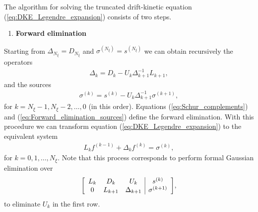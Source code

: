 \documentclass[10pt]{iopart}
\newcommand{\Matrix}[2]
{
	\mleft[
	\begin{array}{#1}
		#2
	\end{array}
	\mright]
}
\begin{document}
The algorithm for solving the truncated drift-kinetic equation (\ref{eq:DKE_Legendre_expansion}) consists of two steps. 
\begin{enumerate}
	\item \textbf{Forward elimination}
\end{enumerate} 	
Starting from $\Delta_{N_\xi} = D_{N_\xi}$ and $\sigma^{(N_\xi)} = s^{(N_\xi)}$ we can obtain recursively the operators
%
\begin{align}
	\Delta_k = D_k - U_{k} \Delta_{k+1}^{-1} L_{k+1}, 
	\label{eq:Schur_complements}
\end{align} 
and the sources
%
\begin{align}
	\sigma^{(k)} = s^{(k)} - U_k \Delta_{k+1}^{-1}    \sigma^{(k+1)},
	\label{eq:Forward_elimination_sources}
\end{align}
for $k=N_\xi-1, N_\xi-2, \ldots, 0$ (in this order). Equations (\ref{eq:Schur_complements}) and (\ref{eq:Forward_elimination_sources}) define the forward elimination. With this procedure we can transform equation (\ref{eq:DKE_Legendre_expansion}) to the equivalent system
%
\begin{align}
	L_{k} f^{(k-1)} + \Delta_{k} f^{(k)} = \sigma^{(k)},
	\label{eq:DKE_Forward_elimination}
\end{align}
for $k=0,1, \ldots, N_\xi$. Note that this process corresponds to perform formal Gaussian elimination over 
%
\begin{align}
	\Matrix{ccc|c}
	{
		L_{k} & D_{k} & U_k  & s^{(k)} \\
		0& L_{k+1} & \Delta_{k+1}  & \sigma^{(k+1)} \\
	}
	,
	\label{eq:DKE_Forward_Elimination}
\end{align}
to eliminate $U_k$ in the first row.
\end{document}
